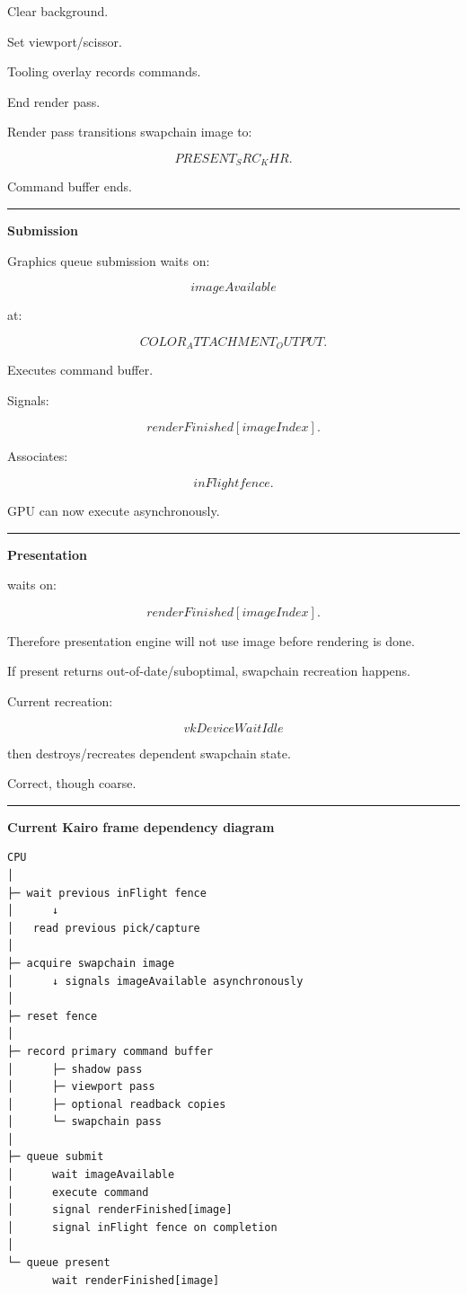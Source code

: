 Clear background.

Set viewport/scissor.

Tooling overlay records commands.

End render pass.

Render pass transitions swapchain image to:

\[
PRESENT_SRC_KHR.
\]

Command buffer ends.

\begin{center}\rule{0.5\linewidth}{0.5pt}\end{center}

\textbf{Submission}

Graphics queue submission waits on:

\[
imageAvailable
\]

at:

\[
COLOR_ATTACHMENT_OUTPUT.
\]

Executes command buffer.

Signals:

\[
renderFinished[imageIndex].
\]

Associates:

\[
inFlight fence.
\]

GPU can now execute asynchronously.

\begin{center}\rule{0.5\linewidth}{0.5pt}\end{center}

\textbf{Presentation}

 waits on:

\[
renderFinished[imageIndex].
\]

Therefore presentation engine will not use image before rendering is done.

If present returns out-of-date/suboptimal, swapchain recreation happens.

Current recreation:

\[
vkDeviceWaitIdle
\]

then destroys/recreates dependent swapchain state.

Correct, though coarse.

\begin{center}\rule{0.5\linewidth}{0.5pt}\end{center}

\textbf{Current Kairo frame dependency diagram}

\begin{verbatim}
CPU
│
├─ wait previous inFlight fence
│      ↓
│   read previous pick/capture
│
├─ acquire swapchain image
│      ↓ signals imageAvailable asynchronously
│
├─ reset fence
│
├─ record primary command buffer
│      ├─ shadow pass
│      ├─ viewport pass
│      ├─ optional readback copies
│      └─ swapchain pass
│
├─ queue submit
│      wait imageAvailable
│      execute command
│      signal renderFinished[image]
│      signal inFlight fence on completion
│
└─ queue present
       wait renderFinished[image]
\end{verbatim}


